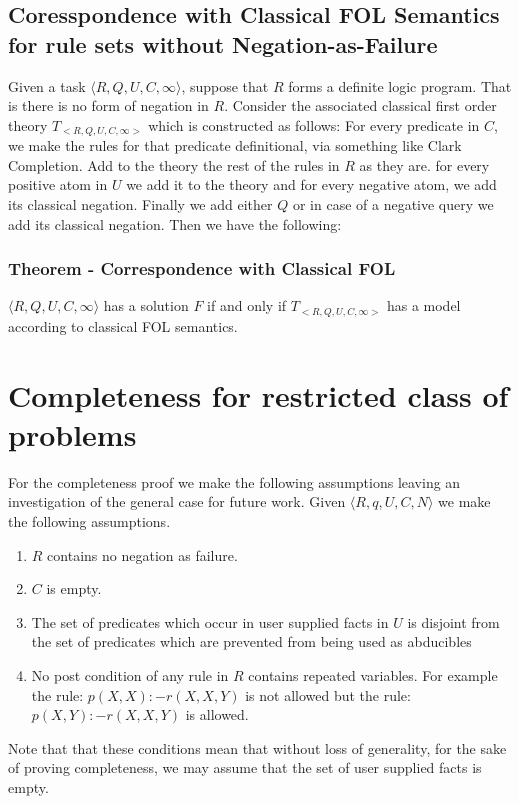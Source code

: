 \documentclass[sigconf]{acmart}
\begin{document}
\subsection{Coresspondence with Classical FOL Semantics for rule sets without Negation-as-Failure}

Given a task $\langle R,Q,U,C,\infty\rangle$, suppose that $R$ forms a definite logic
program. That is there is no form of negation in $R$. Consider the associated
classical first order theory $T_{<R,Q,U,C,\infty>}$ which is constructed as
follows: For every predicate in $C$, we make the rules for that predicate
definitional, via something like Clark Completion. Add to the theory the rest
of the rules in $R$ as they are. for every positive atom in $U$ we add it to
the theory and for every negative atom, we add its classical negation. Finally
we add either $Q$ or in case of a negative query we add its classical
negation. Then we have the following:

\subsubsection{Theorem - Correspondence with Classical FOL}
$\langle R,Q,U,C,\infty\rangle$ has a solution $F$ if and only if $T_{<R,Q,U,C,\infty>}$ has a model according to classical FOL semantics.


\section{Completeness for restricted class of problems}
For the completeness proof we make the following assumptions leaving an investigation of the general case for future work. Given $\langle R,q,U,C,N\rangle$ we make the following assumptions.

\begin{enumerate}
\item $R$ contains no negation as failure.
\item $C$ is empty.
\item The set of predicates which occur in user supplied facts in $U$ is
  disjoint from the set of predicates which are prevented from being used as
  abducibles
\item No post condition of any rule in $R$ contains repeated variables. For example the rule:
$p(X,X):-r(X,X,Y)$ is not allowed but the rule: $p(X,Y):-r(X,X,Y)$ is allowed.
\end{enumerate}

Note that that these conditions mean that without loss of generality, for the
sake of proving completeness, we may assume that the set of user supplied
facts is empty.
\end{document}

